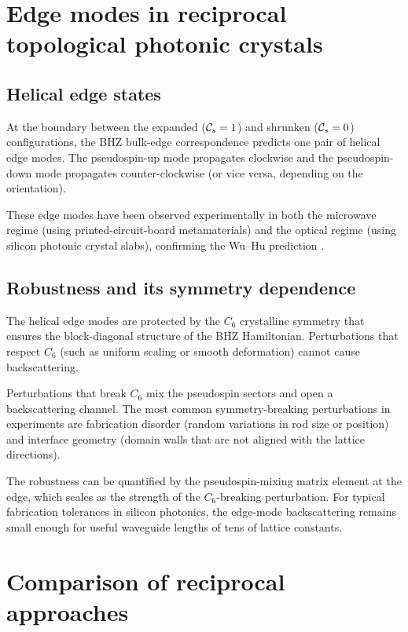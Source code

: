 \section{Edge modes in reciprocal topological photonic crystals}
\label{sec:ch11-edge-modes}

\subsection{Helical edge states}
\label{sec:ch11-helical-edge}

At the boundary between the expanded ($\mathcal{C}_s=1$) and shrunken
($\mathcal{C}_s=0$) configurations, the BHZ bulk-edge correspondence
predicts one pair of helical edge modes.  The pseudospin-up mode
propagates clockwise and the pseudospin-down mode propagates
counter-clockwise (or vice versa, depending on the orientation).

These edge modes have been observed experimentally in both the
microwave regime (using printed-circuit-board metamaterials) and the
optical regime (using silicon photonic crystal slabs), confirming the
Wu--Hu prediction \cite{he2019silicon}.

\subsection{Robustness and its symmetry dependence}
\label{sec:ch11-robustness}

The helical edge modes are protected by the $C_6$ crystalline symmetry
that ensures the block-diagonal structure of the BHZ Hamiltonian.
Perturbations that respect $C_6$ (such as uniform scaling or smooth
deformation) cannot cause backscattering.

Perturbations that break $C_6$ mix the pseudospin sectors and open a
backscattering channel.  The most common symmetry-breaking
perturbations in experiments are fabrication disorder (random variations
in rod size or position) and interface geometry (domain walls that are
not aligned with the lattice directions).

The robustness can be quantified by the pseudospin-mixing matrix
element at the edge, which scales as the strength of the
$C_6$-breaking perturbation.  For typical fabrication tolerances in
silicon photonics, the edge-mode backscattering remains small enough
for useful waveguide lengths of tens of lattice constants.

\section{Comparison of reciprocal approaches}
\label{sec:ch11-comparison}

